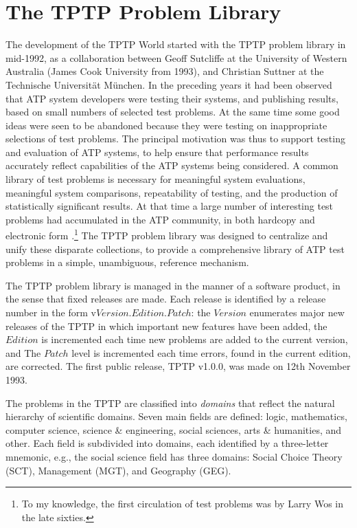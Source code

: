 \documentclass{easychair}
\begin{document}
\section{The TPTP Problem Library}
\label{TPTP}

The development of the TPTP World started with the TPTP problem library in mid-1992, as a 
collaboration between Geoff Sutcliffe at the University of Western Australia (James Cook 
University from 1993), and Christian Suttner at the Technische Universit{\"a}t M{\"u}nchen.
In the preceding years it had been observed that ATP system developers were testing their
systems, and publishing results, based on small numbers of selected test problems.
At the same time some good ideas were seen to be abandoned because they were testing on
inappropriate selections of test problems.
The principal motivation was thus to support testing and evaluation of ATP systems, to help 
ensure that performance results accurately reflect capabilities of the ATP systems being 
considered. 
A common library of test problems is necessary for meaningful system evaluations, meaningful system 
comparisons, repeatability of testing, and the production of statistically significant results. 
At that time a large number of interesting test problems had accumulated in the ATP community, in
both hardcopy \cite{MOW76,WM76,Pel86-JAR,BL+86,Qua92-JAR,MW92-CADE-11} and electronic form
\cite{ANL,SPRFN}.\footnote{To my knowledge, the first circulation of test problems was by 
Larry Wos in the late sixties.} 
The TPTP problem library was designed to centralize and unify these disparate collections, 
to provide a comprehensive library of ATP test problems in a simple, unambiguous, reference 
mechanism.

The TPTP problem library is managed in the manner of a software product, in the sense that fixed 
releases are made.
Each release is identified by a release number in the form v$Version$.$Edition$.$Patch$:
the $Version$ enumerates major new releases of the TPTP in which important new features have 
been added,
the $Edition$ is incremented each time new problems are added to the current version, and
The $Patch$ level is incremented each time errors, found in the current edition, are corrected. 
The first public release, TPTP v1.0.0, was made on 12th November 1993.

The problems in the TPTP are classified into {\em domains} that reflect the natural hierarchy of 
scientific domains.
Seven main fields are defined: logic, mathematics, computer science, science \& engineering, 
social sciences, arts \& humanities, and other. 
Each field is subdivided into domains, each identified by a three-letter mnemonic, e.g., the
social science field has three domains: Social Choice Theory (SCT), Management (MGT), and
Geography (GEG).
\end{document}
